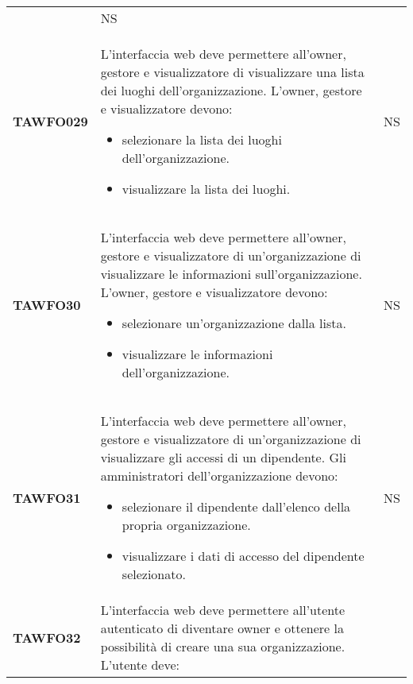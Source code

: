 \documentclass[../piano-di-qualifica.tex]{subfiles}
\begin{document}
\begin{centering}
\begin{longtable}[H]{>{\centering\bfseries}m{3cm} >{}p{10cm} >{\centering\arraybackslash}m{3cm}}
                      & NS \\
        TAWFO029      & L'interfaccia web deve permettere all'owner, gestore e visualizzatore di visualizzare una lista dei luoghi dell'organizzazione. \newline
                        L'owner, gestore e visualizzatore devono:
                          \begin{itemize}
                            \item selezionare la lista dei luoghi dell'organizzazione.
                            \item visualizzare la lista dei luoghi.
                          \end{itemize}
                      & NS \\
        TAWFO30       & L'interfaccia web deve permettere all'owner, gestore e visualizzatore di un'organizzazione di visualizzare le informazioni sull'organizzazione. \newline
                          L'owner, gestore e visualizzatore devono:
                            \begin{itemize}
                              \item selezionare un'organizzazione dalla lista.
                              \item visualizzare le informazioni dell'organizzazione.
                            \end{itemize}
                      & NS \\
        TAWFO31       & L'interfaccia web deve permettere all'owner, gestore e visualizzatore di un'organizzazione di visualizzare gli accessi di un dipendente. \newline
                        Gli amministratori dell'organizzazione devono:
                          \begin{itemize}
                            \item selezionare il dipendente dall'elenco della propria organizzazione.
                            \item visualizzare i dati di accesso del dipendente selezionato.
                          \end{itemize}
                      & NS \\
        TAWFO32       & L'interfaccia web deve permettere all'utente autenticato di diventare owner e ottenere la possibilità di creare una sua organizzazione. \newline
                        L'utente deve:

\end{longtable}
\end{centering}
\end{document}

